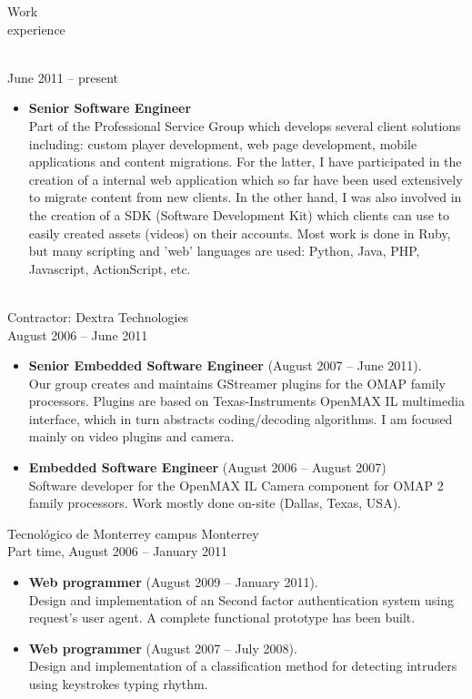 \documentclass{resume}
\def\itesm{Tecnol\'ogico de Monterrey campus Monterrey}
\begin{document}
\begin{category}{Work \\experience}

\\
 June 2011 -- present
\begin{itemize}
\item \textbf{Senior Software Engineer}\\
Part of the Professional Service Group which develops several client solutions including: 
custom player development, web page development, mobile applications and content migrations.
For the latter, I have participated in the creation of a internal web application which so 
far have been used extensively to migrate content from new clients. In the other hand, 
I was also involved in the creation of a SDK (Software Development Kit) which clients 
can use to easily created assets (videos) on their accounts. Most work is done in Ruby, 
but many scripting and 'web' languages are used: Python, Java, PHP, Javascript, ActionScript, etc.
\end{itemize}

\\
Contractor: Dextra Technologies\\
August 2006 -- June 2011
\begin{itemize}
\item \textbf{Senior Embedded Software Engineer} (August 2007 -- June 2011).\\
Our group creates and maintains GStreamer plugins for the OMAP family processors. Plugins are based on Texas-Instruments OpenMAX IL multimedia interface,
which in turn abstracts coding/decoding algorithms. I am focused mainly on video plugins and camera.\\
\item \textbf{Embedded Software Engineer} (August 2006 -- August 2007)\\
Software developer for the OpenMAX IL Camera component for OMAP 2 family processors. Work mostly done on-site (Dallas, Texas, USA).\\
\end{itemize}

\citem\itesm\\
Part time, August 2006 -- January 2011
\begin{itemize}
\item \textbf{Web programmer} (August 2009 -- January 2011).\\
Design and implementation of an Second factor authentication system using request's user agent. A complete functional prototype has been built.
\item \textbf{Web programmer} (August 2007 -- July 2008).\\
Design and implementation of a classification method for detecting intruders using keystrokes typing rhythm.
\end{itemize}
\end{category}
\end{document}
